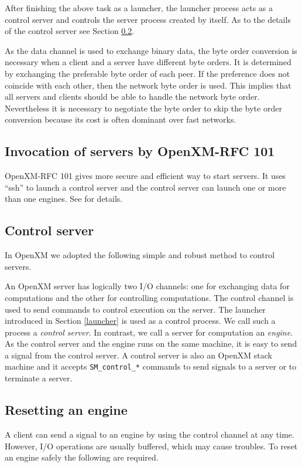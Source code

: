 After finishing the above task as a launcher, the launcher process
acts as a control server and controls the server process created by
itself. As to the details of the control server see Section \ref{control}.

As the data channel is used to exchange binary data,
the byte order conversion is necessary when a
client and a server have different byte orders. It is determined by
exchanging the preferable byte order of each peer. If the preference
does not coincide with each other,
then the network byte order is used.
This implies that all servers and clients should be able to
handle the network byte
order. Nevertheless it is necessary to negotiate the byte order to
skip the byte order conversion because its cost is often dominant over
fast networks.

\subsection{Invocation of servers by OpenXM-RFC 101}
OpenXM-RFC 101 \cite{ox-rfc-101} gives more secure and
efficient way to start servers.
It uses ``ssh'' to launch a control server and 
the control server can launch one or more than one
engines.
See \cite{ox-rfc-101} for details.

\subsection{Control server}
\label{control}
In OpenXM we adopted the following simple and robust method to 
control servers.

An OpenXM server has logically two I/O channels: one for exchanging
data for computations and the other for controlling computations. The
control channel is used to send commands to control execution on the
server. The launcher introduced in Section \ref{launcher}
is used as a control process. We call such a process a {\it
control server}. In contrast, we call a server for computation an {\it
engine}. As the control server and the engine runs on the
same machine, it is easy to send a signal from the control server. 
A control server is also an
OpenXM stack machine and it accepts {\tt SM\_control\_*} commands
to send signals to a server or to terminate a server.

\subsection{Resetting an engine}

A client can send a signal to an engine by using the control channel 
at any time. However, I/O operations are usually buffered,
which may cause troubles.
To reset an engine safely the following are required.


